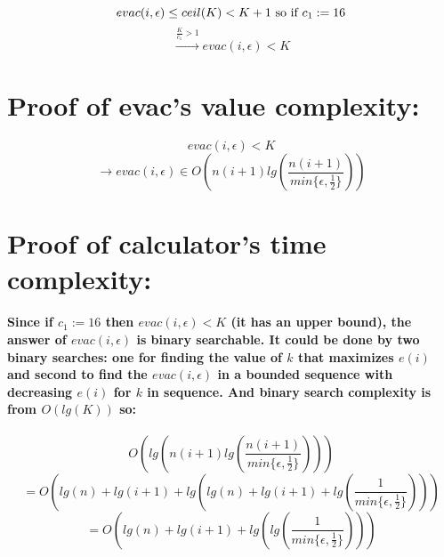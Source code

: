 \documentclass[oneside]{book}
\newcommand{\myparagraph}[1]{\paragraph{\textnormal{#1}}}
\begin{document}
$$evac(i, \epsilon) \le ceil(K) < K + 1 \textnormal{ so if } c_1 := 16 $$
$$ \xrightarrow{\frac{K}{c_1} > 1} evac(i, \epsilon) < K$$

\section{Proof of evac's value complexity:}

$$evac(i, \epsilon) < K$$
$$\rightarrow evac(i, \epsilon) \in O(n(i+1)lg(\frac{n(i+1)}{min\{\epsilon, \frac{1}{2}\}}))$$

\section{Proof of calculator's time complexity:}

\myparagraph{
Since if $c_1 := 16$ then $evac(i, \epsilon) < K$ (it has an upper bound), the answer of $evac(i, \epsilon)$ is binary searchable. It could be done by two binary searches: one for finding the value of $k$ that maximizes $e(i)$ and second to find the $evac(i, \epsilon)$ in a bounded sequence with decreasing $e(i)$ for $k$ in sequence. And binary search complexity is from $O(lg(K))$ so:
}

$$O(lg(n(i+1)lg(\frac{n(i+1)}{min\{\epsilon, \frac{1}{2}\}})))$$
$$= O(lg(n)+lg(i+1)+lg(lg(n) + lg(i+1) + lg(\frac{1}{min\{\epsilon, \frac{1}{2}\}})))$$
$$= O(lg(n)+lg(i+1)+lg(lg(\frac{1}{min\{\epsilon, \frac{1}{2}\}})))$$
\end{document}
